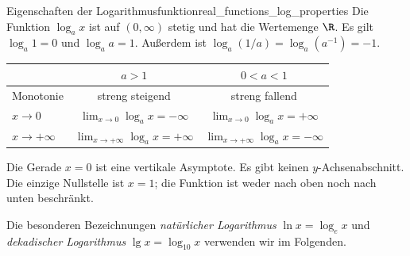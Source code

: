 \begin{TheoremBox}{Eigenschaften der Logarithmusfunktion}{real_functions_log_properties}
  Die Funktion $\log_a x$ ist auf $(0,\infty)$ stetig und hat die
  \textcolor{green!55!black}{Wertemenge} $\R$. Es gilt $\log_a1=0$ und $\log_a a=1$.
  Außerdem ist $\log_a(1/a)=\log_a(a^{-1})=-1$.
  \begin{center}
    \renewcommand{\arraystretch}{1.4}
    \begin{tabular}{@{}lcc@{}}
      \toprule
       & $a>1$ & $0<a<1$\\ \midrule
      Monotonie & streng steigend & streng fallend\\
      $x\to0$ & $\lim_{x\to0}\log_a x=-\infty$ & $\lim_{x\to0}\log_a x=+\infty$\\
      $x\to+\infty$ & $\lim_{x\to+\infty}\log_a x=+\infty$ & $\lim_{x\to+\infty}\log_a x=-\infty$\\
      \bottomrule
    \end{tabular}
  \end{center}
  Die Gerade $x=0$ ist eine \textcolor{green!55!black}{vertikale Asymptote}. Es gibt keinen
  $y$-Achsenabschnitt.
  Die einzige Nullstelle ist $x=1$; die Funktion ist weder nach oben
  noch nach unten beschränkt.
\end{TheoremBox}
Die besonderen Bezeichnungen
\emph{natürlicher Logarithmus} 
$\ln x=\log_e x$ und \emph{dekadischer Logarithmus}
 $\lg x=\log_{10}x$ verwenden wir im Folgenden.

